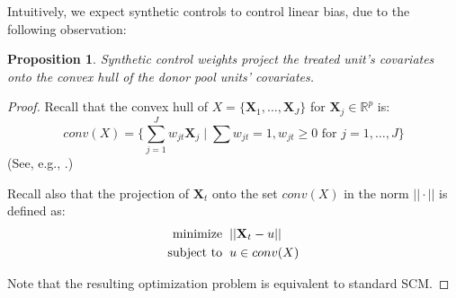 \documentclass{article}
\newtheorem{proposition}[theorem]{Proposition}
\newcommand{\Xt}{\mathbf{X}_t}
\newcommand{\Xj}{\mathbf{X}_j}
\begin{document}
Intuitively, we expect synthetic controls to control linear bias, due to the following observation:
\begin{proposition}
\label{prop:scm_is_projection}
Synthetic control weights project the treated unit's covariates onto the convex hull of the donor pool units' covariates.
\end{proposition}
\begin{proof}
    Recall that the convex hull of $X = \{\mathbf{X}_1, \dots, \mathbf{X}_J\}$ for $\Xj \in \mathbb{R}^p$ is:
    \begin{equation*}
        conv(X) = \{\sum_{j=1}^J w_{jt} \Xj \mid \sum w_{jt} = 1, w_{jt} \geq 0 \text{ for } j = 1, \dots, J\}
    \end{equation*}
    (See, e.g., \citet{boyd2004convex}.)
    
    Recall also that the projection of $\Xt$ onto the set $conv(X)$ in the norm $||\cdot||$ is defined as:
    \begin{align*}
        \text{minimize} &\hspace{2mm} ||\Xt - u|| \\
        \text{subject to} &\hspace{2mm} u \in conv(X)
    \end{align*}
    
    Note that the resulting optimization problem is equivalent to standard SCM.
\end{proof}
\end{document}
